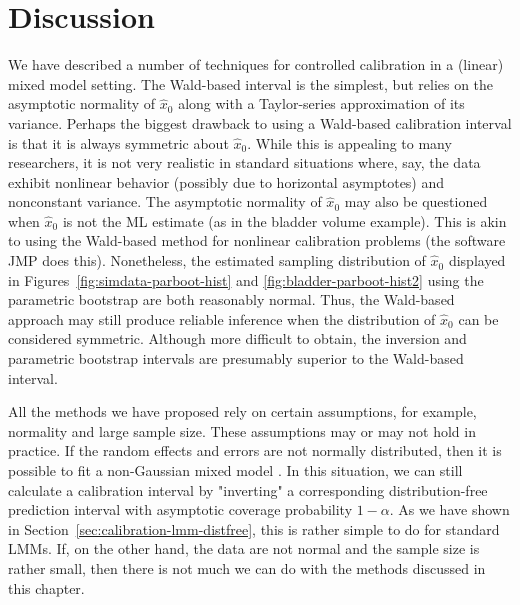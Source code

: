 \documentclass[cmfont,usenames,dvipsnames,leqno]{afit-etd}\usepackage[]{graphicx}\usepackage[]{color}
\newcommand{\wh}[1]{\ensuremath{\widehat{#1}}}
\begin{document}

\section{Discussion}
We have described a number of techniques for controlled calibration in a (linear) mixed model setting. The Wald-based interval is the simplest, but relies on the asymptotic normality of $\wh{x}_0$ along with a Taylor-series approximation of its variance. Perhaps the biggest drawback to using a Wald-based calibration interval is that it is always symmetric about $\wh{x}_0$. While this is appealing to many researchers, it is not very realistic in standard situations where, say, the data exhibit nonlinear behavior (possibly due to horizontal asymptotes) and nonconstant variance. The asymptotic normality of $\wh{x}_0$ may also be questioned when $\wh{x}_0$ is not the ML estimate (as in the bladder volume example). This is akin to using the Wald-based method for nonlinear calibration problems (the software JMP does this). Nonetheless, the estimated sampling distribution of $\wh{x}_0$ displayed in Figures~\ref{fig:simdata-parboot-hist} and \ref{fig:bladder-parboot-hist2} using the parametric bootstrap are both reasonably normal. Thus, the Wald-based approach may still produce reliable inference when the distribution of $\wh{x}_0$ can be considered symmetric. Although more difficult to obtain, the inversion and parametric bootstrap  intervals are presumably superior to the Wald-based interval.

All the methods we have proposed rely on certain assumptions, for example, normality and large sample size. These assumptions may or may not hold in practice. If the random effects and errors are not normally distributed, then it is possible to fit a non-Gaussian mixed model \citep[p. 8]{jiang_linear_2007}. In this situation, we can still calculate a calibration interval by "inverting" a corresponding distribution-free prediction interval with asymptotic coverage probability $1-\alpha$. As we have shown in Section~\ref{sec:calibration-lmm-distfree}, this is rather simple to do for standard LMMs. If, on the other hand, the data are not normal and the sample size is rather small, then there is not much we can do with the methods discussed in this chapter. 
\end{document}
